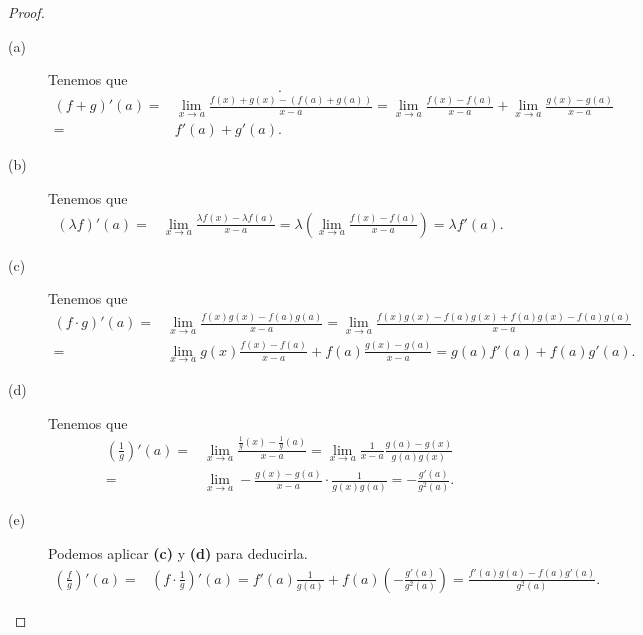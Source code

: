 \begin{proof}
\begin{description}
\item[(a)] Tenemos que
	\[ .\]
	\[
	\begin{split}
		\left(f+g\right)'\left(a\right) = & \lim_{x \to a}\frac{f\left(x\right)+g\left(x\right)-\left(f\left(a\right)+g\left(a\right)\right)}{x-a} = \lim_{x \to a}\frac{f\left(x\right)-f\left(a\right)}{x-a} + \lim_{x \to a}\frac{g\left(x\right)-g\left(a\right)}{x-a} \\
		= &  f'\left(a\right) + g'\left(a\right) .
	\end{split}
	\]
\item[(b)] Tenemos que 
	\[
	\begin{split}
		\left(\lambda f\right)'\left(a\right) = & \lim_{x \to a}\frac{\lambda f\left(x\right)-\lambda f\left(a\right)}{x-a} = \lambda \left(\lim_{x \to a}\frac{f\left(x\right)-f\left(a\right)}{x-a}\right) = \lambda f'\left(a\right) .
	\end{split}
	\]
	
\item[(c)] Tenemos que 
	\[
	\begin{split}
		\left(f \cdot g\right)'\left(a\right) = & \lim_{x \to a}\frac{f\left(x\right)g\left(x\right) - f\left(a\right)g\left(a\right)}{x - a} = \lim_{x \to a}\frac{f\left(x\right)g\left(x\right)-f\left(a\right)g\left(x\right)+f\left(a\right)g\left(x\right)-f\left(a\right)g\left(a\right)}{x-a} \\
		= & \lim_{x \to a} g\left(x\right) \frac{f\left(x\right)-f\left(a\right)}{x-a} + f\left(a\right) \frac{g\left(x\right)-g\left(a\right)}{x-a} = g\left(a\right)f'\left(a\right) + f\left(a\right)g'\left(a\right).
	\end{split}
	\]
\item[(d)] Tenemos que
	\[
	\begin{split}
		\left(\frac{1}{g}\right)'\left(a\right) = & \lim_{x \to a}\frac{\frac{1}{g}\left(x\right)-\frac{1}{g}\left(a\right)}{x - a} = \lim_{x \to a}\frac{1}{x -a}\frac{g\left(a\right)-g\left(x\right)}{g\left(a\right)g\left(x\right)} \\
		= & \lim_{x \to a}-\frac{g\left(x\right)-g\left(a\right)}{x-a} \cdot \frac{1}{g\left(x\right)g\left(a\right)} = -\frac{g'\left(a\right)}{g^{2}\left(a\right)} .
	\end{split}
	\]
\item[(e)] Podemos aplicar \textbf{(c)} y \textbf{(d)} para deducirla.
	\[
	\begin{split}
		\left(\frac{f}{g}\right)'\left(a\right) = & \left(f \cdot \frac{1}{g}\right)'\left(a\right) = f'\left(a\right) \frac{1}{g\left(a\right)} + f\left(a\right)\left(-\frac{g'\left(a\right)}{g^{2}\left(a\right)}\right) = \frac{f'\left(a\right)g\left(a\right)-f\left(a\right)g'\left(a\right)}{g^{2}\left(a\right)}.
	\end{split}
	\]
	
\end{description}
\end{proof}
